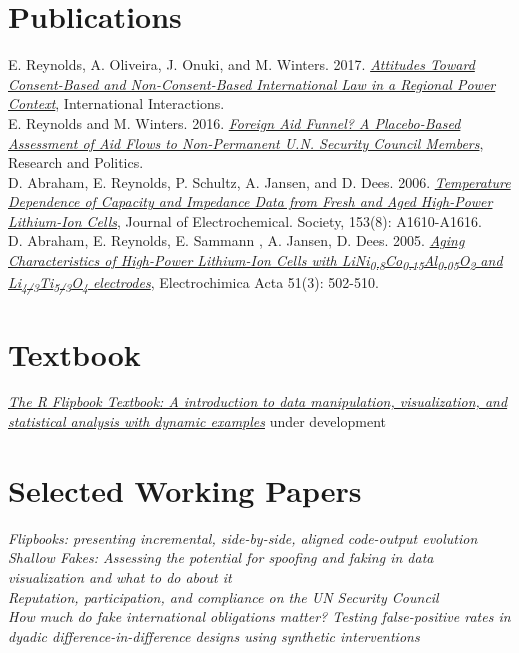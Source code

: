 \documentclass[margin, 10pt]{CVStyleTemplate}\usepackage[]{graphicx}\usepackage[dvipsnames]{xcolor}
\begin{document}
\begin{resume}
\section{Publications}

E. Reynolds, A. Oliveira, J. Onuki,
 and M. Winters. 2017. \emph{\href{http://www.tandfonline.com/doi/abs/10.1080/03050629.2018.1408012}{Attitudes Toward Consent-Based and Non-Consent-Based International Law in a Regional Power Context}}, International Interactions.\\[6pt]
E. Reynolds and M. Winters. 2016. \emph{\href{http://rap.sagepub.com/content/3/1/2053168015626167}{Foreign Aid Funnel? A Placebo-Based Assessment of Aid Flows to Non-Permanent U.N. Security Council Members}}, Research and Politics. \\[6pt]%
D. Abraham, E. Reynolds, P. Schultz, A. Jansen, and D. Dees. 2006. \emph{\href{http://jes.ecsdl.org/content/153/8/A1610.abstract}{Temperature Dependence of Capacity and Impedance Data from Fresh and Aged High-Power Lithium-Ion Cells}}, Journal of Electrochemical. Society, 153(8): A1610-A1616. \\[6pt]%
D. Abraham, E. Reynolds, E. Sammann , A. Jansen,  D. Dees. 2005. \emph{\href{http://www.sciencedirect.com/science/article/pii/S0013468605004433}{Aging Characteristics of High-Power Lithium-Ion Cells with LiNi\textsubscript{0.8}Co\textsubscript{0.15}Al\textsubscript{0.05}O\textsubscript{2} and Li\textsubscript{4/3}Ti\textsubscript{5/3}O\textsubscript{4} electrodes}}, Electrochimica Acta 51(3): 502-510.%

\section{Textbook}

\emph{\href{https://evamaerey.github.io/flipbooks/textbook}{The R Flipbook Textbook: A introduction to data manipulation, visualization, and statistical analysis with dynamic examples}} under development


\section{Selected Working Papers}


\emph{Flipbooks: presenting incremental, side-by-side, aligned code-output evolution}\\[6pt]
\emph{Shallow Fakes: Assessing the potential for spoofing and faking in data visualization and what to do about it}\\[6pt]
\emph{Reputation, participation, and compliance on the UN Security Council}\\[6pt]
\emph{How much do \emph{fake} international obligations matter?  Testing false-positive rates in dyadic difference-in-difference designs using synthetic interventions}\\[6pt]


\end{resume}
\end{document}
